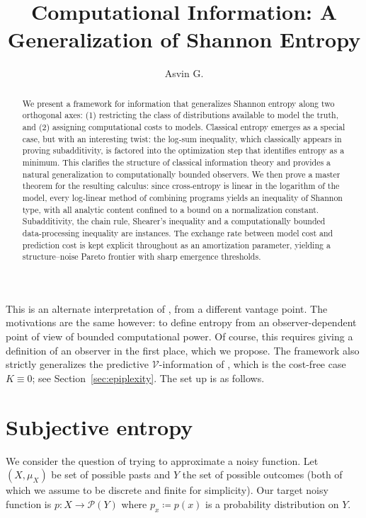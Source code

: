 \documentclass[11pt]{article}
\title{Computational Information: A Generalization of Shannon Entropy}
\author{Asvin G.}
\begin{document}
\maketitle

\begin{abstract}
We present a framework for information that generalizes Shannon entropy along two orthogonal axes:
(1) restricting the class of distributions available to model the truth, and
(2) assigning computational costs to models.
Classical entropy emerges as a special case, but with an interesting twist: the log-sum inequality,
which classically appears in proving subadditivity, is factored into the optimization step that
identifies entropy as a minimum. This clarifies the structure of classical information theory
and provides a natural generalization to computationally bounded observers.
We then prove a master theorem for the resulting calculus: since cross-entropy is linear in the
logarithm of the model, every log-linear method of combining programs yields an inequality of
Shannon type, with all analytic content confined to a bound on a normalization constant.
Subadditivity, the chain rule, Shearer's inequality and a computationally bounded data-processing
inequality are instances. The exchange rate between model cost and prediction cost is kept explicit throughout as an
amortization parameter, yielding a structure--noise Pareto frontier with sharp emergence
thresholds.
\end{abstract}

This is an alternate interpretation of \cite{finzi2025}, from a different vantage point. The motivations are the same however: to define entropy from an observer-dependent point of view of bounded computational power. Of course, this requires giving a definition of an observer in the first place, which we propose. The framework also strictly generalizes the predictive $\mathcal V$-information of \cite{xu2020}, which is the cost-free case $K \equiv 0$; see Section~\ref{sec:epiplexity}. The set up is as follows.


\section{Subjective entropy}

We consider the question of trying to approximate a noisy function. Let $(X,\mu_X)$ be set of possible pasts and $Y$ the set of possible outcomes (both of which we assume to be discrete and finite for simplicity). Our target noisy function is $p: X \to \mathcal P(Y)$ where $p_x \coloneqq p(x)$ is a probability distribution on $Y$. 
\end{document}
